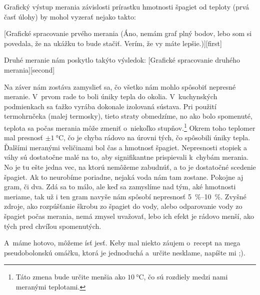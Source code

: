 Grafický výstup merania závislosti prírastku hmotnosti špagiet od teploty (prvá časť úlohy) by mohol vyzerať nejako takto:

[Grafické spracovanie prvého merania (Áno, nemám graf plný bodov, lebo som si povedala, že na ukážku to bude stačiť. Verím, že vy máte lepšie.)][first]

Druhé meranie nám poskytlo takýto výsledok:
\nopagebreak
{}[Grafické spracovanie druhého merania][second]



Na záver nám zostáva zamyslieť sa, čo všetko nám mohlo spôsobiť nepresné meranie.
V~prvom rade to boli úniky tepla do okolia. V~kuchynských podmienkach sa ťažko vyrába dokonale izolovaná sústava. 
Pri použití termohrnčeka (malej termosky), tieto straty obmedzíme, no ako bolo spomenuté, teplota sa počas merania môže zmeniť
o~niekoľko stupňov.\footnote{Táto zmena bude určite menšia ako $\SI{10}{\celsius}$, čo sú rozdiely medzi nami 
meranými teplotami.} Okrem toho teplomer mal presnosť $\pm \SI{1}{\celsius}$, čo je chyba rádovo na úrovni tých, čo spôsobili 
úniky tepla. 
Ďalšími meranými veličinami bol čas a hmotnosť špagiet. Nepresnosti stopiek a váhy sú dostatočne malé na to, 
aby signifikantne prispievali k~chybám merania. No je tu ešte jedna vec, na ktorú nemôžeme zabudnúť, 
a to je dostatočné scedenie špagiet. Ak to neurobíme poriadne, nejaká voda nám tam zostane. Pokojne aj gram, či dva. 
Zdá sa to málo, ale keď sa zamyslíme nad tým, aké hmotnosti meriame, tak už i ten gram navyše nám spôsobí nepresnosť 
\SIrange{5}{10}{\percent}. Zvyšné zdroje, ako rozpúšťanie škrobu zo špagiet do vody, alebo odparovanie vody zo špagiet počas merania,
nemá zmysel uvažovať, lebo ich efekt je rádovo menší, ako tých pred chvíľou spomenutých.

A~máme hotovo, môžeme ísť jesť. Keby mal niekto záujem o~recept na mega pseudobolonskú omáčku, ktorá je jednoduchá a~určite nesklame, napíšte mi ;).
